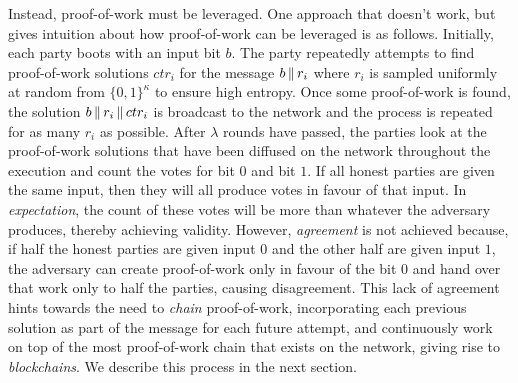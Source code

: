 Instead, proof-of-work must be leveraged. One approach that doesn't work, but
gives intuition about how proof-of-work can be leveraged is as follows.
Initially, each party boots with an input bit $b$. The party repeatedly attempts
to find proof-of-work solutions $ctr_i$ for the message $b \,\|\, r_i$ where $r_i$
is sampled uniformly at random from $\{0, 1\}^\kappa$ to ensure high entropy.
Once some proof-of-work is found, the solution $b \,\|\, r_i \,\|\, ctr_i$ is broadcast
to the network and the process is repeated for as many $r_i$ as possible. After
$\lambda$ rounds have passed, the parties look at the proof-of-work solutions
that have been diffused on the network throughout the execution and count the
votes for bit $0$ and bit $1$. If all honest parties are given the same input,
then they will all produce votes in favour of that input. In \emph{expectation},
the count of these votes will be more than whatever the adversary produces,
thereby achieving validity. However, \emph{agreement} is not achieved because,
if half the honest parties are given input $0$ and the other half are given
input $1$, the adversary can create proof-of-work only in favour of the bit $0$
and hand over that work only to half the parties, causing disagreement. This
lack of agreement hints towards the need to \emph{chain} proof-of-work,
incorporating each previous solution as part of the message for each future
attempt, and continuously work on top of the most proof-of-work chain that
exists on the network, giving rise to \emph{blockchains}. We describe this
process in the next section.

